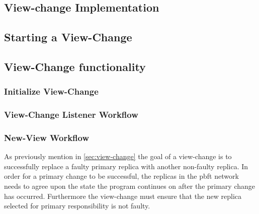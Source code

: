 

\iffalse
\subsection{View-change Implementation}
\subsection{Starting a View-Change}
\subsection{View-Change functionality}
\subsubsection{Initialize View-Change}
\subsubsection{View-Change Listener Workflow}
\subsubsection{New-View Workflow}

As previously mention in \autoref{sec:view-change} the goal of a view-change is to successfully replace a faulty primary replica with another non-faulty replica. In order for a primary change to be successful, the replicas in the \ac{pbft} network needs to agree upon the state the program continues on after the primary change has occurred. Furthermore the view-change must ensure that the new replica selected for primary responsibility is not faulty. 

